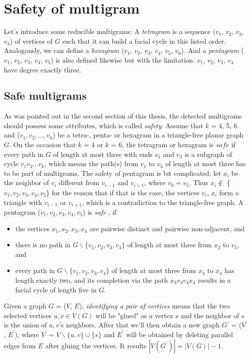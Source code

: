 \section{Safety of multigram}
Let's introduce some reducible multigrams: A \textit{tetragram} is a sequence ($v_1$, $v_2$, $v_3$, $v_4$) of vertices of $G$ such that it can build a facial cycle in this listed order. Analogously, we can define a \textit{hexagram} ($v_1$, $v_2$, $v_3$, $v_4$, $v_5$, $v_6$). And a \textit{pentagram} ($v_1$, $v_2$, $v_3$, $v_4$, $v_5$) is also defined likewise but with the limitation: $v_1$, $v_2$, $v_3$, $v_4$ have degree exactly three.

\subsection{Safe multigrams}
As was pointed out in the second section of this thesis, the detected multigrams should possess some attributes, which is called \textit{safety}. Assume that $k$ = 4, 5, 6 and ($v_1, v_2, ..., v_k$) be a tetra-, penta- or hexagram in a triangle-free planar graph $G$. On the occasion that $k$ = 4 or $k$ = 6, the tetragram or hexagram is $safe$ if every path in $G$ of length at most three with ends $v_1$ and $v_3$ is a subgraph of cycle $v_1v_2...v_k$, which means the path(s) from $v_1$ to $v_3$ of length at most three has to be part of multigrams. The safety of pentagram is bit complicated: let $x_i$ be the neighbor of $v_i$ different from $v_{i-1}$ and $v_{i+1}$, where $v_0 = v_5$. Thus $x_i \notin$ \{$v_1, v_2, v_3, v_4, v_5$\} for the reason that if that is the case, the vertices $v_i$, $x_i$ form a triangle with $v_{i-1}$ or $v_{i+1}$, which is a contradiction to the triangle-free graph. A pentagram ($v_1, v_2, v_3, v_4, v_5$) is \textit{safe} \cite{dvorak2013threecoloring}, if
\begin{itemize}
    \item the vertices $x_1, x_2, x_3, x_4$ are pairwise distinct and pairwise non-adjacent, and
    \item there is no path in $G \backslash \{v_1, v_2, v_3, v_4\}$ of length at most three from $x_2$ to $v_5$, and
    \item every path in $G \backslash \{v_1, v_2, v_3, v_4\}$ of length at most three from $x_3$ to $x_4$ has length exactly two, and its completion via the path $x_3v_3v_4x_4$ results in a facial cycle of length five in $G$.
\end{itemize}

\begin{definition}
Given a graph $G$ = ($V$, $E$), \textit{identifying a pair of vertices} means that the two selected vertices $u, v \in V(G)$ will be "glued" as a vertex $s$ and the neighbor of $s$ is the union of $u, v$'s neighbors. After that we'll then obtain a new graph $G^{'}$ = ($V^{'}$, $E^{'}$), where $V^{'} = V \backslash \{u, v\} \cup \{s\}$ and $E^{'}$ will be obtained by deleting parallel edges from $E$ after gluing the vertices.  It results $|V(G^{'})| = |V(G)| - 1$.
\end{definition}

